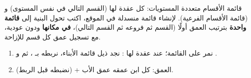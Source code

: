 \begin{statement}
قائمة الأقسام متعددة المستويات: كل عقدة لها  (القسم التالي في نفس المستوى) و  (قائمة الأقسام الفرعية). لإنشاء قائمة منسدلة في الموقع، اكتب  تحول البنية إلى \textbf{قائمة واحدة} بترتيب العمق أولًا (القسم ثم فروعه ثم القسم التالي)، \textbf{في مكانها} ودون عودية، مع تسجيل عمق كل قسم للإزاحة.
\end{statement}
\begin{stepsbox}\begin{enumerate}
\item نمر على القائمة؛ عند عقدة لها : نجد ذيل قائمة الأبناء، نربطه بـ ، ثم  و .
\item العمق: كل ابن عمقه عمق الأب +  (نضبطه قبل الربط).
\end{enumerate}\end{stepsbox}
